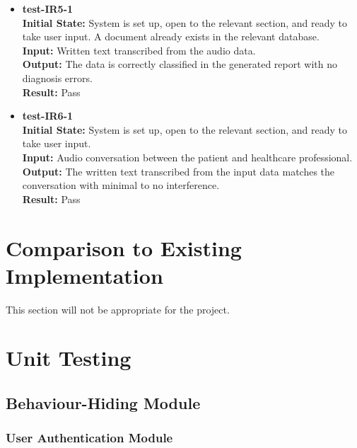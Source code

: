 \documentclass[12pt, titlepage]{article}
\begin{document}
\begin{itemize}
\item \textbf{test-IR5-1} \label{test-IR5-1} \\
\textbf{Initial State:} System is set up, open to the relevant section, and ready to take user input. A document already exists in the relevant database. \\
\textbf{Input:} Written text transcribed from the audio data. \\
\textbf{Output:} The data is correctly classified in the generated report with no diagnosis errors. \\
\textbf{Result:} Pass \\
\end{itemize}

\begin{itemize}
\item \textbf{test-IR6-1} \label{test-IR6-1} \\
\textbf{Initial State:} System is set up, open to the relevant section, and ready to take user input. \\
\textbf{Input:} Audio conversation between the patient and healthcare professional. \\
\textbf{Output:} The written text transcribed from the input data matches the conversation with minimal to no interference. \\
\textbf{Result:} Pass \\
\end{itemize}


\section{Comparison to Existing Implementation}	

This section will not be appropriate for the project.

\section{Unit Testing}

\subsection{Behaviour-Hiding Module}

\subsubsection{User Authentication Module}
\end{document}
